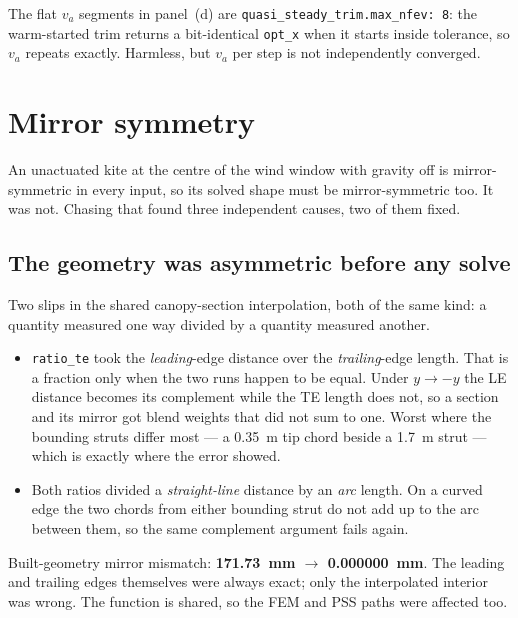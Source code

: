 \documentclass[11pt,a4paper]{article}
\newcommand{\code}[1]{\texttt{\small #1}}
\begin{document}
The flat $v_a$ segments in panel~(d) are \code{quasi\_steady\_trim.max\_nfev: 8}:
the warm-started trim returns a bit-identical \code{opt\_x} when it starts inside
tolerance, so $v_a$ repeats exactly. Harmless, but $v_a$ per step is not
independently converged.

\section{Mirror symmetry}
\label{sec:symmetry}

An unactuated kite at the centre of the wind window with gravity off is
mirror-symmetric in every input, so its solved shape must be mirror-symmetric
too. It was not. Chasing that found three independent causes, two of them fixed.

\subsection{The geometry was asymmetric before any solve}

Two slips in the shared canopy-section interpolation, both of the same kind: a
quantity measured one way divided by a quantity measured another.

\begin{itemize}
  \item \code{ratio\_te} took the \emph{leading}-edge distance over the
    \emph{trailing}-edge length. That is a fraction only when the two runs
    happen to be equal. Under $y \to -y$ the LE distance becomes its complement
    while the TE length does not, so a section and its mirror got blend weights
    that did not sum to one. Worst where the bounding struts differ most --- a
    \SI{0.35}{\metre} tip chord beside a \SI{1.7}{\metre} strut --- which is
    exactly where the error showed.
  \item Both ratios divided a \emph{straight-line} distance by an \emph{arc}
    length. On a curved edge the two chords from either bounding strut do not
    add up to the arc between them, so the same complement argument fails again.
\end{itemize}

Built-geometry mirror mismatch: \textbf{\SI{171.73}{\milli\metre} $\rightarrow$
\SI{0.000000}{\milli\metre}}. The leading and trailing edges themselves were
always exact; only the interpolated interior was wrong. The function is shared,
so the FEM and PSS paths were affected too.
\end{document}

